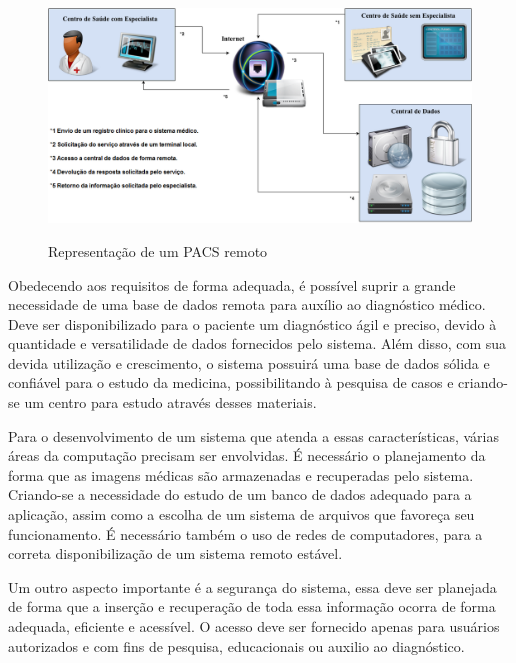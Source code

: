\begin{figure}[ht]
	\centering	
	\caption[\hspace{0.1cm}Diagrama da Arquitetura.]{Representação de um PACS remoto}
	\vspace{-0.4cm}
	\includegraphics[width=1.0\textwidth]{figuras/diagramas/remoto.png}
	\vspace{-0.2cm}
	\label{fig:figura1}
\end{figure}

Obedecendo aos requisitos de forma adequada, é possível suprir a grande necessidade de uma base de dados remota para auxílio ao diagnóstico médico.
Deve ser disponibilizado para o paciente um diagnóstico ágil e preciso, devido à quantidade e versatilidade de dados fornecidos pelo sistema.
Além disso, com sua devida utilização e crescimento, o sistema possuirá uma base de dados sólida e confiável para o estudo da medicina, possibilitando à pesquisa de casos e criando-se um centro para estudo através desses materiais.

Para o desenvolvimento de um sistema que atenda a essas características, várias áreas da computação precisam ser envolvidas.
É necessário o planejamento da forma que as imagens médicas são armazenadas e recuperadas pelo sistema.
Criando-se a necessidade do estudo de um banco de dados adequado para a aplicação, assim como a escolha de um sistema de arquivos que favoreça seu funcionamento.
É necessário também o uso de redes de computadores, para a correta disponibilização de um sistema remoto estável.

Um outro aspecto importante é a segurança do sistema, essa deve ser planejada de forma que a inserção e recuperação de toda essa informação ocorra de forma adequada, eficiente e acessível.
O acesso deve ser fornecido apenas para usuários autorizados e com fins de pesquisa, educacionais ou auxilio ao diagnóstico.

